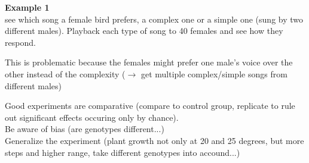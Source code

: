 \documentclass{article}
\begin{document}
\textbf{Example 1}\\
see which song a female bird prefers, a complex one or a simple one (sung by two different males). Playback each type of song to 40 females and see how they respond.\par 
This is problematic because the females might prefer one male's voice over the other instead of the complexity ($\rightarrow$ get multiple complex/simple songs from different males)\par 
\vspace{0.35cm}
\noindent
Good experiments are comparative (compare to control group, replicate to rule out significant effects occuring only by chance).\\
Be aware of bias (are genotypes different...)\\
Generalize the experiment (plant growth not only at 20 and 25 degrees, but more steps and higher range, take different genotypes into accound...)\\
\end{document}
